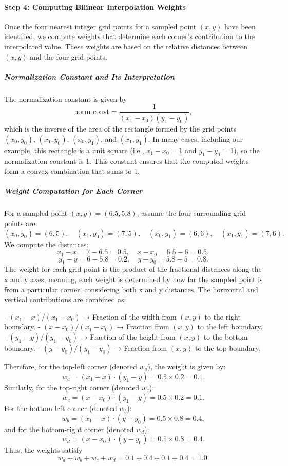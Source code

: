 \paragraph{Step 4: Computing Bilinear Interpolation Weights}
Once the four nearest integer grid points for a sampled point \((x,y)\) have been identified, we compute weights that determine each corner’s contribution to the interpolated value. These weights are based on the relative distances between \((x,y)\) and the four grid points.

\subparagraph{Normalization Constant and Its Interpretation}
The normalization constant is given by
\[
\text{norm\_const} = \frac{1}{(x_1 - x_0)(y_1 - y_0)},
\]
which is the inverse of the area of the rectangle formed by the grid points \((x_0,y_0)\), \((x_1,y_0)\), \((x_0,y_1)\), and \((x_1,y_1)\). In many cases, including our example, this rectangle is a unit square (i.e., \(x_1 - x_0 = 1\) and \(y_1 - y_0 = 1\)), so the normalization constant is 1. This constant ensures that the computed weights form a convex combination that sums to 1.

\subparagraph{Weight Computation for Each Corner}
For a sampled point \((x,y) = (6.5, 5.8)\), assume the four surrounding grid points are:
\[
(x_0,y_0) = (6,5), \quad (x_1,y_0) = (7,5), \quad (x_0,y_1) = (6,6), \quad (x_1,y_1) = (7,6).
\]
We compute the distances:
\[
x_1 - x = 7 - 6.5 = 0.5, \quad x - x_0 = 6.5 - 6 = 0.5,
\]
\[
y_1 - y = 6 - 5.8 = 0.2, \quad y - y_0 = 5.8 - 5 = 0.8.
\]
The weight for each grid point is the product of the fractional distances along the x and y axes, meaning, each weight is determined by how far the sampled point is from a particular corner, considering both x and y distances. The horizontal and vertical contributions are combined as:

- \((x_1 - x) / (x_1 - x_0)\) → Fraction of the width from \((x, y)\) to the right boundary.
- \((x - x_0) / (x_1 - x_0)\) → Fraction from \((x, y)\) to the left boundary.
- \((y_1 - y) / (y_1 - y_0)\) → Fraction of the height from \((x, y)\) to the bottom boundary.
- \((y - y_0) / (y_1 - y_0)\) → Fraction from \((x, y)\) to the top boundary.

Therefore, for the top-left corner (denoted \(w_a\)), the weight is given by:
\[
w_a = (x_1 - x) \cdot (y_1 - y) = 0.5 \times 0.2 = 0.1.
\]
Similarly, for the top-right corner (denoted \(w_c\)):
\[
w_c = (x - x_0) \cdot (y_1 - y) = 0.5 \times 0.2 = 0.1.
\]
For the bottom-left corner (denoted \(w_b\)):
\[
w_b = (x_1 - x) \cdot (y - y_0) = 0.5 \times 0.8 = 0.4,
\]
and for the bottom-right corner (denoted \(w_d\)):
\[
w_d = (x - x_0) \cdot (y - y_0) = 0.5 \times 0.8 = 0.4.
\]
Thus, the weights satisfy
\[
w_a + w_b + w_c + w_d = 0.1 + 0.4 + 0.1 + 0.4 = 1.0.
\]



